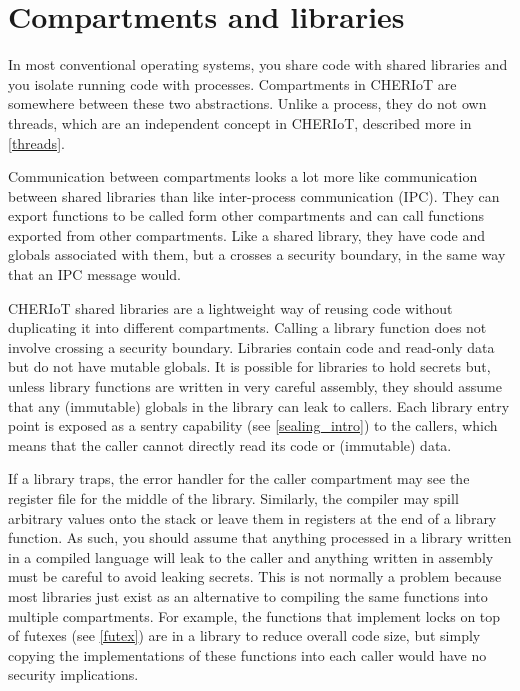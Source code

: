 \chapter[label=compartments]{Compartments and libraries}

In most conventional operating systems, you share code with shared libraries and you isolate running code with processes.
Compartments in CHERIoT are somewhere between these two abstractions.
Unlike a process, they do not own threads, which are an independent concept in CHERIoT, described more in \ref{threads}.

Communication between compartments looks a lot more like communication between shared libraries than like inter-process communication (IPC).
They can export functions to be called form other compartments and can call functions exported from other compartments.
Like a shared library, they have code and globals associated with them, but a  crosses a security boundary, in the same way that an IPC message would.

CHERIoT shared libraries are a lightweight way of reusing code without duplicating it into different compartments.
Calling a library function does not involve crossing a security boundary.
Libraries contain code and read-only data but do not have mutable globals.
It is possible for libraries to hold secrets but, unless library functions are written in very careful assembly, they should assume that any (immutable) globals in the library can leak to callers.
Each library entry point is exposed as a sentry capability (see \ref{sealing_intro}) to the callers, which means that the caller cannot directly read its code or (immutable) data.

\begin{warning}
If a library traps, the error handler for the caller compartment may see the register file for the middle of the library.
Similarly, the compiler may spill arbitrary values onto the stack or leave them in registers at the end of a library function.
As such, you should assume that anything processed in a library written in a compiled language will leak to the caller and anything written in assembly must be  careful to avoid leaking secrets.
This is not normally a problem because most libraries just exist as an alternative to compiling the same functions into multiple compartments.
For example, the functions that implement locks on top of futexes (see \ref{futex}) are in a library to reduce overall code size, but simply copying the implementations of these functions into each caller would have no security implications.
\end{warning}

